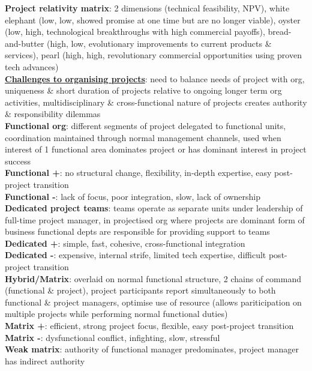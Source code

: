 \documentclass[a4paper]{article}
\begin{document}
\begin{multicols}{2}
        \textbf{Project relativity matrix}: 2 dimensions (technical feasibility, NPV), white elephant (low, low, showed promise at one time but are no longer viable), oyster (low, high, technological breakthroughs with high commercial payoffs), bread-and-butter (high, low, evolutionary improvements to current products \& services), pearl (high, high, revolutionary commercial opportunities using proven tech advances)\\
        \underline{\textbf{Challenges to organising projects}}: need to balance needs of project with org, uniqueness \& short duration of projects relative to ongoing longer term org activities, multidisciplinary \& cross-functional nature of projects creates authority \& responsibility dilemmas\\
        \textbf{Functional org}: different segments of project delegated to functional units, coordination maintained through normal management channels, used when interest of 1 functional area dominates project or has dominant interest in project success\\
        \textbf{Functional +}: no structural change, flexibility, in-depth expertise, easy post-project transition\\
        \textbf{Functional -}: lack of focus, poor integration, slow, lack of ownership\\
        \textbf{Dedicated project teams}: teams operate as separate units under leadership of full-time project manager, in projectised org where projects are dominant form of business functional depts are responsible for providing support to teams\\
        \textbf{Dedicated +}: simple, fast, cohesive, cross-functional integration\\
        \textbf{Dedicated -}: expensive, internal strife, limited tech expertise, difficult post-project transition\\
        \textbf{Hybrid/Matrix}: overlaid on normal functional structure, 2 chains of command (functional \& project), project participants report simultaneously to both functional \& project managers, optimise use of resource (allows pariticipation on multiple projects while performing normal functional duties)\\
        \textbf{Matrix +}: efficient, strong project focus, flexible, easy post-project transition\\
        \textbf{Matrix -}: dysfunctional conflict, infighting, slow, stressful\\
        \textbf{Weak matrix}: authority of functional manager predominates, project manager has indirect authority\\

\end{multicols}
\end{document}
